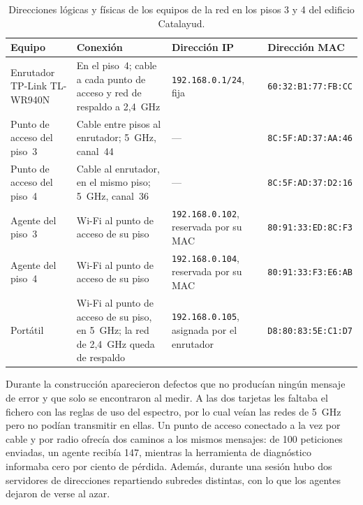 \begin{table}[H]
  \centering\footnotesize
  \caption{Direcciones lógicas y físicas de los equipos de la red en los pisos 3 y 4 del edificio Catalayud.}
  \label{tab:direcciones-red}
  \begin{tabular}{@{}>{\raggedright\arraybackslash}p{}>{\raggedright\arraybackslash}p{}>{\raggedright\arraybackslash}p{}>{\raggedright\arraybackslash}p{}@{}}
    \toprule
    \textbf{Equipo} & \textbf{Conexión} & \textbf{Dirección IP} & \textbf{Dirección MAC} \\ \midrule
    Enrutador TP-Link \mbox{TL-WR940N} & En el piso~4; cable a cada punto de acceso y red de respaldo a 2,4~GHz & \texttt{192.168.0.1/24}, fija & \texttt{60:32:B1:77:FB:CC} \\ \addlinespace
    Punto de acceso del piso~3 & Cable entre pisos al enrutador; 5~GHz, canal~44 & --- & \texttt{8C:5F:AD:37:AA:46} \\ \addlinespace
    Punto de acceso del piso~4 & Cable al enrutador, en el mismo piso; 5~GHz, canal~36 & --- & \texttt{8C:5F:AD:37:D2:16} \\ \addlinespace
    Agente del piso~3 & Wi-Fi al punto de acceso de su piso & \texttt{192.168.0.102}, reservada por su MAC & \texttt{80:91:33:ED:8C:F3} \\ \addlinespace
    Agente del piso~4 & Wi-Fi al punto de acceso de su piso & \texttt{192.168.0.104}, reservada por su MAC & \texttt{80:91:33:F3:E6:AB} \\ \addlinespace
    Portátil & Wi-Fi al punto de acceso de su piso, en 5~GHz; la red de 2,4~GHz queda de respaldo & \texttt{192.168.0.105}, asignada por el enrutador & \texttt{D8:80:83:5E:C1:D7} \\ \bottomrule
  \end{tabular}
\end{table}

Durante la construcción aparecieron defectos que no producían ningún mensaje de error y que solo se encontraron al medir. A las dos tarjetas les faltaba el fichero con las reglas de uso del espectro, por lo
cual veían las redes de 5~GHz pero no podían transmitir en ellas. Un punto de acceso conectado a la vez por cable y por radio ofrecía dos caminos a los mismos mensajes: de 100 peticiones enviadas, un
agente recibía 147, mientras la herramienta de diagnóstico informaba cero por ciento de pérdida. Además, durante una sesión hubo dos servidores de direcciones repartiendo subredes distintas, con lo que
los agentes dejaron de verse al azar.

